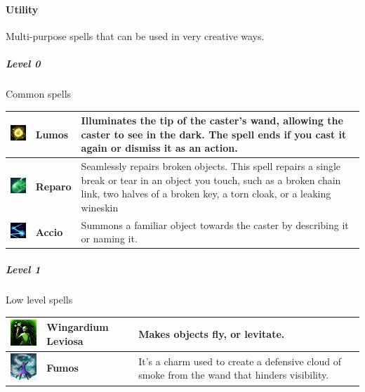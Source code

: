 \paragraph{Utility} 
Multi-purpose spells that can be used in very creative ways. 

\subparagraph{Level 0} 
Common spells \\
\begin{tabular}{ m{2cm}m{3cm}m{8cm}} \hline
  \includegraphics[width=2cm]{../Pictures/Gameplay/Spells/Icon/Lumos_spell_icon.png} & \textbf{Lumos} & Illuminates the tip of the caster's wand, allowing the caster to see in the dark. The spell ends if you cast it again or dismiss it as an action.\\ \hline
	\includegraphics[width=2cm]{../Pictures/Gameplay/Spells/Icon/Reparo_spell_icon.png} & \textbf{Reparo} & Seamlessly repairs broken objects. This spell repairs a single break or tear in an object you touch, such as a broken chain link, two halves of a broken key, a torn cloak, or a leaking wineskin \\ \hline
	\includegraphics[width=2cm]{../Pictures/Gameplay/Spells/Icon/Accio_spell_icon.png} & \textbf{Accio} &  Summons a familiar object towards the caster by describing it or naming it. \\ \hline
\end{tabular}

\subparagraph{Level 1} 
 Low level spells\\
\begin{tabular}{ m{2cm}m{3cm}m{8cm} } \hline
 \includegraphics[width=2cm]{../Pictures/Gameplay/Spells/Icon/Wingardium_spell_icon.png} & \textbf{Wingardium Leviosa} & Makes objects fly, or levitate.   \\ \hline
	\includegraphics[width=2cm]{../Pictures/Gameplay/Spells/Icon/Fumos_spell_icon.png} & \textbf{Fumos} & It's a charm used to create a defensive cloud of smoke from the wand that hinders visibility. \\  \hline
\end{tabular}

